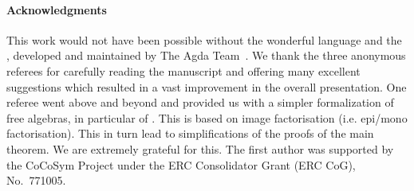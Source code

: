 \paragraph*{Acknowledgments}
This work would not have been possible without the wonderful \agda language and
the \agdastdlib, developed and maintained by The Agda Team~\cite{agdastdlib}.
We thank the three anonymous referees for carefully reading the manuscript and
offering many excellent suggestions which resulted in a vast improvement in the
overall presentation.  One referee went above and beyond and provided us with a
simpler formalization of free algebras, in particular of .
This is based on image factorisation (i.e. epi/mono factorisation). This in
turn lead to simplifications of the proofs of the main theorem. We are
extremely grateful for this.
The first author was supported by the CoCoSym Project
under the ERC Consolidator Grant (ERC CoG), No.~771005.




